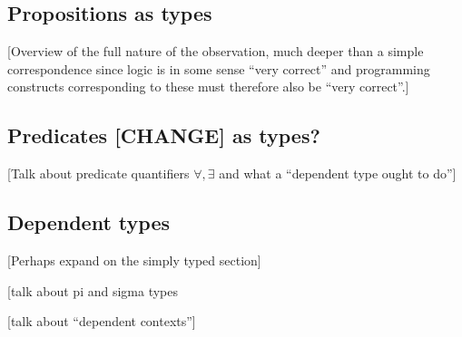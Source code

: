 \subsection{Propositions as types}

[Overview of the full nature of the observation, much deeper than a simple correspondence since logic is in some sense ``very correct'' and programming constructs corresponding to these must therefore also be ``very correct''.]

\subsection{Predicates [CHANGE] as types?}

[Talk about predicate quantifiers $\forall, \exists$ and what a ``dependent type ought to do'']

\subsection{Dependent types}


[Perhaps expand on the simply typed section]

[talk about pi and sigma types

[talk about ``dependent contexts'']


